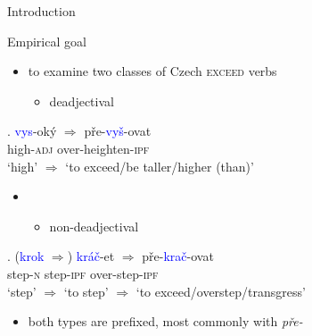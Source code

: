 \documentclass[12pt]{beamer}
\begin{document}
\begin{frame}{Introduction}

Empirical goal

\begin{itemize}
\item to examine two classes of Czech \textsc{exceed} verbs
\begin{itemize}
\item deadjectival
\end{itemize}
\end{itemize}
\exg. {\textcolor{blue}{vys}-oký  $\Rightarrow$} pře-\textcolor{blue}{vyš}-ovat\\
high-\textsc{adj} over-heighten-\textsc{ipf}\\
`high' $\Rightarrow$ `to exceed/be taller/higher (than)'

\begin{itemize}
\item[]
\begin{itemize}
\item non-deadjectival
\end{itemize}
\end{itemize}
\exg. ({\textcolor{blue}{krok} $\Rightarrow$}) {\textcolor{blue}{kráč}-et $\Rightarrow$} pře-\textcolor{blue}{krač}-ovat\\
step-\textsc{n} step-\textsc{ipf} over-step-\textsc{ipf}\\
`step' $\Rightarrow$ `to step' $\Rightarrow$ `to exceed/overstep/transgress'

\begin{itemize}
\item both types %
are prefixed, most commonly with %
\textit{pře-}
\end{itemize}
\end{frame}
\end{document}
